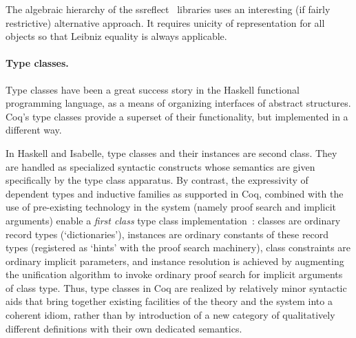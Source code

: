\documentclass[a4paper,10pt,runningheads]{llncs}
\begin{document}
The algebraic hierarchy of the ssreflect~\cite{Packed} libraries uses an interesting (if fairly restrictive) alternative approach. It requires unicity of representation for all objects so that Leibniz equality is always applicable.

\paragraph{Type classes.}

Type classes have been a great success story in the Haskell functional programming language, as a means of organizing interfaces of abstract structures. Coq's type classes provide a superset of their functionality, but implemented in a different way.

In Haskell and Isabelle, type classes and their instances are second class. They are handled as specialized syntactic constructs whose semantics are given specifically by the type class apparatus. By contrast, the expressivity of dependent types and inductive families as supported in Coq, combined with the use of pre-existing technology in the system (namely proof search and implicit arguments) enable a \emph{first class} type class implementation~\cite{DBLP:conf/tphol/SozeauO08}: classes are ordinary record types (`dictionaries'), instances are ordinary constants of these record types (registered as `hints' with the proof search machinery), class constraints are ordinary implicit parameters, and instance resolution is achieved by augmenting the unification algorithm to invoke ordinary proof search for implicit arguments of class type.
Thus, type classes in Coq are realized by relatively minor syntactic aids that bring together existing facilities of the theory and the system into a coherent idiom, rather than by introduction of a new category of qualitatively different definitions with their own dedicated semantics.
\end{document}
